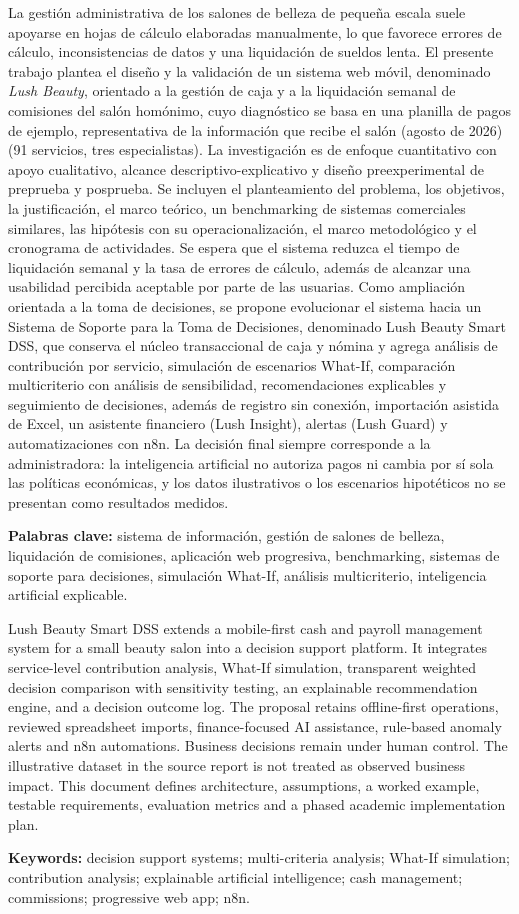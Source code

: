 
La gestión administrativa de los salones de belleza de pequeña escala suele apoyarse en hojas de cálculo elaboradas manualmente, lo que favorece errores de cálculo, inconsistencias de datos y una liquidación de sueldos lenta. El presente trabajo plantea el diseño y la validación de un sistema web móvil, denominado \textit{Lush Beauty}, orientado a la gestión de caja y a la liquidación semanal de comisiones del salón homónimo, cuyo diagnóstico se basa en una planilla de pagos de ejemplo, representativa de la información que recibe el salón (agosto de 2026) (91 servicios, tres especialistas). La investigación es de enfoque cuantitativo con apoyo cualitativo, alcance descriptivo-explicativo y diseño preexperimental de preprueba y posprueba. Se incluyen el planteamiento del problema, los objetivos, la justificación, el marco teórico, un benchmarking de sistemas comerciales similares, las hipótesis con su operacionalización, el marco metodológico y el cronograma de actividades. Se espera que el sistema reduzca el tiempo de liquidación semanal y la tasa de errores de cálculo, además de alcanzar una usabilidad percibida aceptable por parte de las usuarias. Como ampliación orientada a la toma de decisiones, se propone evolucionar el sistema hacia un Sistema de Soporte para la Toma de Decisiones, denominado Lush Beauty Smart DSS, que conserva el núcleo transaccional de caja y nómina y agrega análisis de contribución por servicio, simulación de escenarios What-If, comparación multicriterio con análisis de sensibilidad, recomendaciones explicables y seguimiento de decisiones, además de registro sin conexión, importación asistida de Excel, un asistente financiero (Lush Insight), alertas (Lush Guard) y automatizaciones con n8n. La decisión final siempre corresponde a la administradora: la inteligencia artificial no autoriza pagos ni cambia por sí sola las políticas económicas, y los datos ilustrativos o los escenarios hipotéticos no se presentan como resultados medidos.

\noindent\textbf{Palabras clave:} sistema de información, gestión de salones de belleza, liquidación de comisiones, aplicación web progresiva, benchmarking, sistemas de soporte para decisiones, simulación What-If, análisis multicriterio, inteligencia artificial explicable.


Lush Beauty Smart DSS extends a mobile-first cash and payroll management system for a small beauty salon into a decision support platform. It integrates service-level contribution analysis, What-If simulation, transparent weighted decision comparison with sensitivity testing, an explainable recommendation engine, and a decision outcome log. The proposal retains offline-first operations, reviewed spreadsheet imports, finance-focused AI assistance, rule-based anomaly alerts and n8n automations. Business decisions remain under human control. The illustrative dataset in the source report is not treated as observed business impact. This document defines architecture, assumptions, a worked example, testable requirements, evaluation metrics and a phased academic implementation plan.

\noindent\textbf{Keywords:} decision support systems; multi-criteria analysis; What-If simulation; contribution analysis; explainable artificial intelligence; cash management; commissions; progressive web app; n8n.
